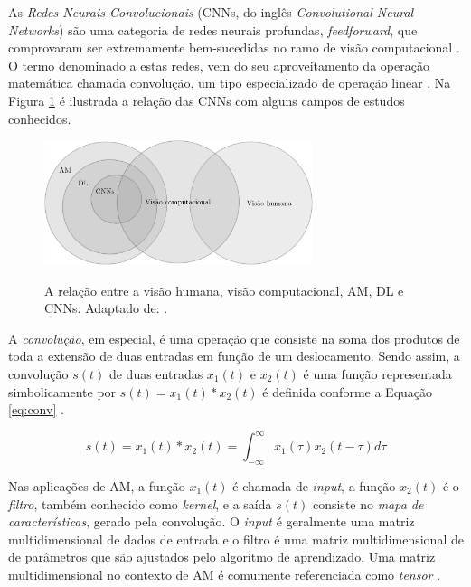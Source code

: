 As \emph{Redes Neurais Convolucionais} (CNNs, do inglês \emph{Convolutional Neural Networks}) são uma categoria de redes neurais profundas, \emph{feedforward}, que comprovaram ser extremamente bem-sucedidas no ramo de visão computacional \cite{khan}. O termo denominado a estas redes, vem do seu aproveitamento da operação matemática chamada convolução, um tipo especializado de operação linear \cite{goodfellow}. Na Figura \ref{fig:areas-ia} é ilustrada a relação das CNNs com alguns campos de estudos conhecidos.

\begin{figure}[h!]
  \centering
  \caption{A relação entre a visão humana, visão computacional, AM, DL e CNNs. Adaptado de: \cite{khan}.}
  \includegraphics[width=0.7\textwidth]{imgs/areas-ia}
  \label{fig:areas-ia}
\end{figure}

A \emph{convolução}, em especial, é uma operação que consiste na soma dos produtos de toda a extensão de duas entradas em função de um deslocamento. Sendo assim, a convolução $s(t)$ de duas entradas $x_1(t)$ e $x_2(t)$ é uma função representada simbolicamente por $s(t) = x_1(t) * x_2(t)$ é definida conforme a Equação \ref{eq:conv} \cite{lathi}.

\begin{equation}
  \label{eq:conv}
  s(t) = x_1(t) * x_2(t) = \int_{-\infty}^{\infty} x_1(\tau)x_2(t - \tau)d\tau
\end{equation}

Nas aplicações de AM, a função $x_1(t)$ é chamada de \emph{input}, a função $x_2(t)$ é o \emph{filtro}, também conhecido como \emph{kernel}, e a saída $s(t)$ consiste no \emph{mapa de características}, gerado pela convolução. O \emph{input} é geralmente uma matriz multidimensional de dados de entrada e o filtro é uma matriz multidimensional de de parâmetros que são ajustados pelo algoritmo de aprendizado. Uma matriz multidimensional no contexto de AM é comumente referenciada como \emph{tensor} \cite{goodfellow}.

